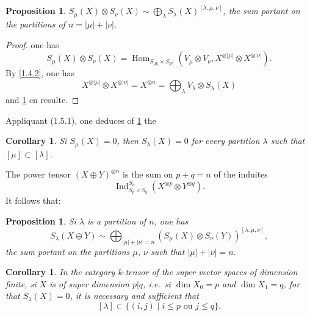 \documentclass[11pt,a4paper]{article}
\theoremstyle{plain}
\newtheorem{proposition}[theorem]{Proposition}
\newtheorem{corollary}[theorem]{Corollary}
\theoremstyle{definition}
\DeclareMathOperator{\Hom}{Hom}
\DeclareMathOperator{\Ind}{Ind}
\begin{document}
\begin{proposition}\label{1.6}
$S_\mu(X)\otimes S_\nu(X)\sim\bigoplus_\lambda S_\lambda(X)^{[\lambda:\mu,\nu]}$, the sum portant on the partitions of $n=|\mu|+|\nu|$.
\end{proposition}

\begin{proof}
one has
\[
S_\mu(X)\otimes S_\nu(X)=\Hom_{S_{|\mu|}\times S_{|\nu|}}(V_\mu\otimes V_\nu,X^{\otimes|\mu|}\otimes X^{\otimes|\nu|}).
\]
By \ref{1.4.2}, one has
\[
X^{\otimes|\mu|}\otimes X^{\otimes|\nu|}=X^{\otimes n}=\bigoplus_\lambda V_\lambda\otimes S_\lambda(X)
\]
and \ref{1.6} en resulte.
\end{proof}

Appliquant (1.5.1), one deduces of \ref{1.6} the

\begin{corollary}\label{1.7}
Si $S_\mu(X)=0$, then $S_\lambda(X)=0$ for every partition $\lambda$ such that $[\mu]\subset[\lambda]$.
\end{corollary}

The power tensor $(X\oplus Y)^{\otimes n}$ is the sum on $p+q=n$ of the induites
\[
\Ind^{S_n}_{S_p\times S_q}(X^{\otimes p}\otimes Y^{\otimes q}).
\]
It follows that:

\begin{proposition}\label{1.8}
Si $\lambda$ is a partition of $n$, one has
\begin{equation}\label{1.8.1}
S_\lambda(X\oplus Y)\sim\bigoplus_{|\mu|+|\nu|=n}(S_\mu(X)\otimes S_\nu(Y))^{[\lambda:\mu,\nu]},
\end{equation}
the sum portant on the partitions $\mu$, $\nu$ such that $|\mu|+|\nu|=n$.
\end{proposition}

\begin{corollary}\label{1.9}
In the category $k$-tensor of the super vector spaces of dimension finite, si $X$ is of super dimension $p|q$, i.e.~si $\dim X_0=p$ and $\dim X_1=q$, for that $S_\lambda(X)=0$, it is necessary and sufficient that
\begin{equation}\label{1.9.1}
[\lambda]\subset\{(i,j)\mid i\leq p\text{ ou }j\leq q\}.
\end{equation}
\end{corollary}
\end{document}
